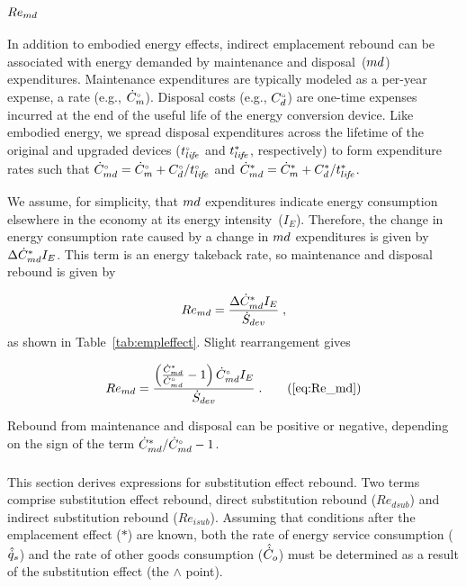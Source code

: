 \paragraph{$Re_{md}$} 
\label{sec:Re_OMd}

In addition to embodied energy effects, 
indirect emplacement rebound 
can be associated with energy demanded by maintenance and disposal~($md$) expenditures.
Maintenance expenditures are typically modeled as a per-year expense, 
a rate (e.g., ${}{\dot{C}}^{\scriptscriptstyle \circ}_m$).
Disposal costs (e.g., ${}{C}^{\scriptscriptstyle \circ}_d$) are one-time expenses incurred 
at the end of the useful life of the energy conversion device.
Like embodied energy, we spread disposal expenditures across the lifetime 
of the original and upgraded devices (${}{t}^{\scriptscriptstyle \circ}_{li\!f\!e}$ and ${t}^*_{li\!f\!e}$, respectively)
to form expenditure rates such that 
${}{\dot{C}}^{\scriptscriptstyle \circ}_{md} = {}{\dot{C}}^{\scriptscriptstyle \circ}_m + {}{C}^{\scriptscriptstyle \circ}_d/{}{t}^{\scriptscriptstyle \circ}_{li\!f\!e}$
and
${\dot{C}}^*_{md} = {\dot{C}}^*_m + {C}^*_d/{t}^*_{li\!f\!e}$.

We assume, for simplicity, that $md$ expenditures indicate energy consumption
elsewhere in the economy at its energy intensity~($I_E$).
Therefore, the change in energy consumption rate caused by a change in $md$ expenditures
is given by $\Delta {\dot{C}}^*_{md} I_E$.
This term is an energy takeback rate,
so maintenance and disposal rebound is given by

\begin{equation} \label{eq:Re_md_def}
  Re_{md} = \frac{\Delta {\dot{C}}^*_{md} I_E}{\dot{S}_{dev}} \; ,
\end{equation}
%
as shown in Table~\ref{tab:empleffect}.
Slight rearrangement gives

\begin{equation}
  Re_{\md} = \ReOMdeqn{} \; . \tag{\ref{eq:Re_md}}
\end{equation}

Rebound from maintenance and disposal can be positive or negative,
depending on the sign of the term ${\dot{C}}^*_{md}/{}{\dot{C}}^{\scriptscriptstyle \circ}_{md} - 1$.


\subsubsection{\Subeffect{}} 
\label{sec:Re_sub}

This section derives expressions for substitution effect rebound.
Two terms comprise substitution effect rebound,
direct substitution rebound ($Re_{dsub}$) and
indirect substitution rebound ($Re_{isub}$).
Assuming that conditions after the emplacement effect ($*$) are known, 
both the 
rate of energy service consumption ($\hat{\dot{q}}_s$) and
the rate of other goods consumption ($\hat{\dot{C}}_o$) 
must be determined as a result of the substitution effect
(the $\wedge$ point).

